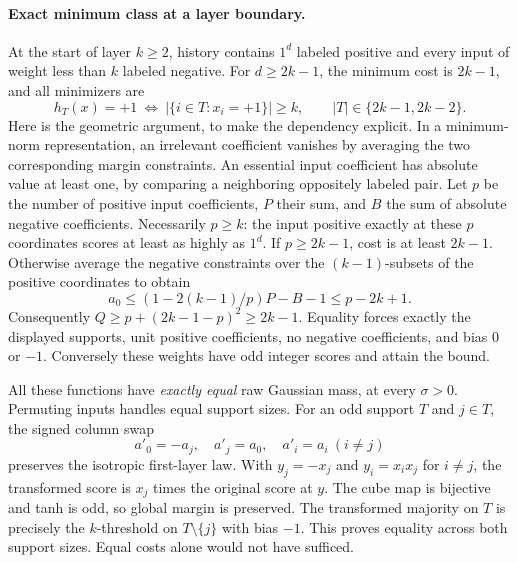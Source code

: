 \documentclass[11pt]{article}
\begin{document}
\paragraph{Exact minimum class at a layer boundary.}
At the start of layer $k\ge2$, history contains $1^d$ labeled positive and every input of weight less than $k$ labeled negative. For $d\ge2k-1$, the minimum cost is $2k-1$, and all minimizers are
\[
 h_T(x)=+1\ \Longleftrightarrow\ |\{i\in T:x_i=+1\}|\ge k,
 \qquad |T|\in\{2k-1,2k-2\}.
\]
Here is the geometric argument, to make the dependency explicit. In a minimum-norm representation, an irrelevant coefficient vanishes by averaging the two corresponding margin constraints. An essential input coefficient has absolute value at least one, by comparing a neighboring oppositely labeled pair. Let $p$ be the number of positive input coefficients, $P$ their sum, and $B$ the sum of absolute negative coefficients. Necessarily $p\ge k$: the input positive exactly at these $p$ coordinates scores at least as highly as $1^d$. If $p\ge2k-1$, cost is at least $2k-1$. Otherwise average the negative constraints over the $(k-1)$-subsets of the positive coordinates to obtain
\[
 a_0\le (1-2(k-1)/p)P-B-1\le p-2k+1.
\]
Consequently $Q\ge p+(2k-1-p)^2\ge2k-1$. Equality forces exactly the displayed supports, unit positive coefficients, no negative coefficients, and bias $0$ or $-1$. Conversely these weights have odd integer scores and attain the bound.

All these functions have \emph{exactly equal} raw Gaussian mass, at every $\sigma>0$. Permuting inputs handles equal support sizes. For an odd support $T$ and $j\in T$, the signed column swap
\[
 a'_0=-a_j,\quad a'_j=a_0,\quad a'_i=a_i\ (i\ne j)
\]
preserves the isotropic first-layer law. With $y_j=-x_j$ and $y_i=x_ix_j$ for $i\ne j$, the transformed score is $x_j$ times the original score at $y$. The cube map is bijective and tanh is odd, so global margin is preserved. The transformed majority on $T$ is precisely the $k$-threshold on $T\setminus\{j\}$ with bias $-1$. This proves equality across both support sizes. Equal costs alone would not have sufficed.
\end{document}
